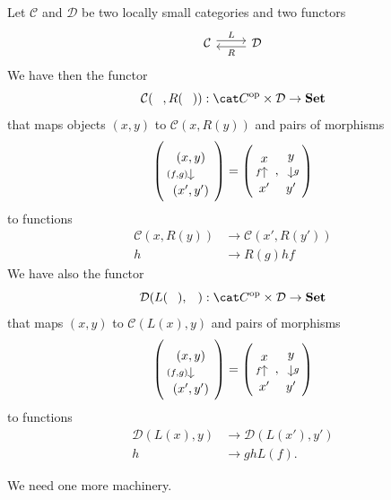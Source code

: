 \begin{construction}
  Let \(\mathcal{C}\) and \(\mathcal{D}\) be two locally small categories and two
  functors
  \[\begin{tikzcd} \mathcal{C} \ar["L", r, shift left] & \mathcal{D} \ar["R", l,
      shift left] \end{tikzcd}\] We have then the functor
  \[\mathcal{C}(\hole, R(\hole)) : \opcat C \times \mathcal{D} \to \Set\]
  that maps objects \((x, y)\) to \(\mathcal{C}(x, R(y))\) and pairs of
  morphisms
  \[\left(\begin{tikzcd}[row sep=small](x, y) \ar["{(f, g)}", d, swap]
        \\ (x', y')\end{tikzcd}\right) = \left(\begin{tikzcd}[row
        sep=small]x \\ x' \ar["f", u]\end{tikzcd}, \begin{tikzcd}[row
        sep=small]y \ar["g", d] \\ y'\end{tikzcd}\right)\] to functions
  \[\begin{aligned}
    \mathcal{C}(x, R(y)) &\to \mathcal{C}(x', R(y')) \\
    h &\to R(g) h f
  \end{aligned}\]
We have also the functor
\[\mathcal{D}(L(\hole), \hole) : \opcat C \times \mathcal{D} \to \Set\]
that maps \((x, y)\) to \(\mathcal{C}(L(x), y)\) and pairs of morphisms
\[\left(\begin{tikzcd}[row sep=small](x, y) \ar["{(f, g)}", d, swap]
      \\ (x', y')\end{tikzcd}\right) = \left(\begin{tikzcd}[row
      sep=small]x \\ x' \ar["f", u]\end{tikzcd}, \begin{tikzcd}[row
      sep=small]y \ar["g", d] \\ y'\end{tikzcd}\right)\] to functions
\[\begin{aligned}
  \mathcal{D}(L(x), y) &\to \mathcal{D}(L(x'), y') \\
  h &\to g h L(f) .
\end{aligned}\]
\end{construction}

We need one more machinery.

